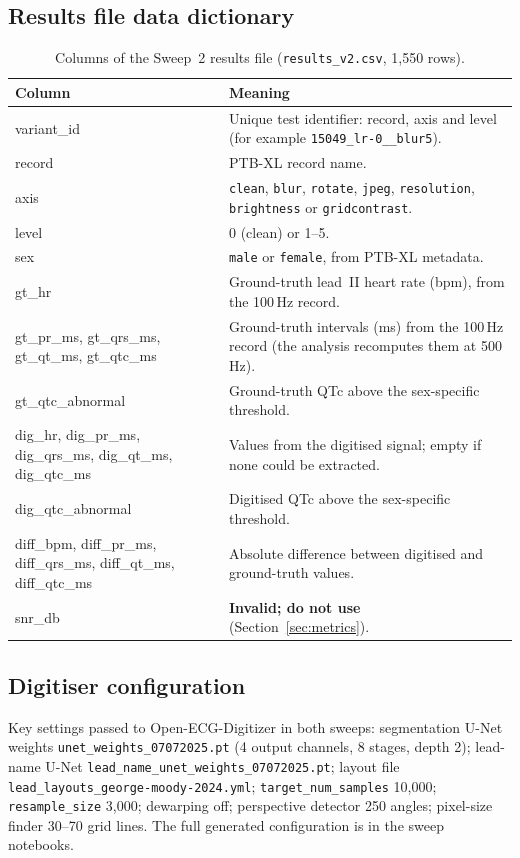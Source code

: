 \subsection{Results file data dictionary}
\begin{longtable}{@{}>{\ttfamily}p{3.6cm}p{11.2cm}@{}}
\caption{Columns of the Sweep~2 results file (\texttt{results\_v2.csv}, 1{,}550 rows).}\label{tab:dict}\\
\toprule
Column & Meaning \\
\midrule
\endfirsthead
variant\_id & Unique test identifier: record, axis and level (for example \texttt{15049\_lr-0\_\_blur5}). \\
record & PTB-XL record name. \\
axis & \texttt{clean}, \texttt{blur}, \texttt{rotate}, \texttt{jpeg}, \texttt{resolution}, \texttt{brightness} or \texttt{gridcontrast}. \\
level & 0 (clean) or 1--5. \\
sex & \texttt{male} or \texttt{female}, from PTB-XL metadata. \\
gt\_hr & Ground-truth lead~II heart rate (bpm), from the 100\,Hz record. \\
gt\_pr\_ms, gt\_qrs\_ms, gt\_qt\_ms, gt\_qtc\_ms & Ground-truth intervals (ms) from the 100\,Hz record (the analysis recomputes them at 500\,Hz). \\
gt\_qtc\_abnormal & Ground-truth QTc above the sex-specific threshold. \\
dig\_hr, dig\_pr\_ms, dig\_qrs\_ms, dig\_qt\_ms, dig\_qtc\_ms & Values from the digitised signal; empty if none could be extracted. \\
dig\_qtc\_abnormal & Digitised QTc above the sex-specific threshold. \\
diff\_bpm, diff\_pr\_ms, diff\_qrs\_ms, diff\_qt\_ms, diff\_qtc\_ms & Absolute difference between digitised and ground-truth values. \\
snr\_db & \textbf{Invalid; do not use} (Section~\ref{sec:metrics}). \\
\bottomrule
\end{longtable}

\subsection{Digitiser configuration}
Key settings passed to Open-ECG-Digitizer in both sweeps: segmentation U-Net weights \texttt{unet\_weights\_07072025.pt} (4 output channels, 8 stages, depth 2); lead-name U-Net \texttt{lead\_name\_unet\_weights\_07072025.pt}; layout file \texttt{lead\_layouts\_george-moody-2024.yml}; \texttt{target\_num\_samples} 10{,}000; \texttt{resample\_size} 3{,}000; dewarping off; perspective detector 250 angles; pixel-size finder 30--70 grid lines. The full generated configuration is in the sweep notebooks.

